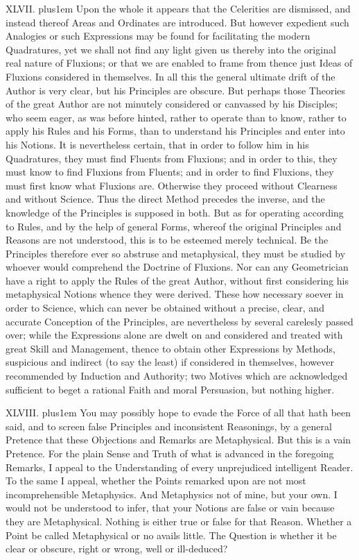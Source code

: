XLVII. \hskip 0pt plus1em
Upon the whole it appears that the Celerities are dismissed, and
instead thereof Areas and Ordinates are introduced.  But however
expedient such Analogies or such Expressions may be found for
facilitating the modern Quadratures, yet we shall not find any
light given us thereby into the original real nature of Fluxions;
or that we are enabled to frame from thence just Ideas of
Fluxions considered in themselves.  In all this the general
ultimate drift of the Author is very clear, but his Principles
are obscure.  But perhaps those Theories of the great Author are
not minutely considered or canvassed by his Disciples; who seem
eager, as was before hinted, rather to operate than to know,
rather to apply his Rules and his Forms, than to understand his
Principles and enter into his Notions.  It is nevertheless
certain, that in order to follow him in his Quadratures, they
must find Fluents from Fluxions; and in order to this, they must
know to find Fluxions from Fluents; and in order to find
Fluxions, they must first know what Fluxions are.  Otherwise they
proceed without Clearness and without Science.  Thus the direct
Method precedes the inverse, and the knowledge of the Principles
is supposed in both.  But as for operating according to Rules,
and by the help of general Forms, whereof the original Principles
and Reasons are not understood, this is to be esteemed merely
technical.  Be the Principles therefore ever so abstruse and
metaphysical, they must be studied by whoever would comprehend
the Doctrine of Fluxions.  Nor can any Geometrician have a right
to apply the Rules of the great Author, without first considering
his metaphysical Notions whence they were derived.  These how
necessary soever in order to Science, which can never be obtained
without a precise, clear, and accurate Conception of the
Principles, are nevertheless by several carelesly passed over;
while the Expressions alone are dwelt on and considered and
treated with great Skill and Management, thence to obtain other
Expressions by Methods, suspicious and indirect (to say the
least) if considered in themselves, however recommended by
Induction and Authority; two Motives which are acknowledged
sufficient to beget a rational Faith and moral Persuasion, but
nothing higher.

\medbreak

XLVIII. \hskip 0pt plus1em
You may possibly hope to evade the Force of all that hath been
said, and to screen false Principles and inconsistent Reasonings,
by a general Pretence that these Objections and Remarks are
Metaphysical.  But this is a vain Pretence.  For the plain Sense
and Truth of what is advanced in the foregoing Remarks, I appeal
to the Understanding of every unprejudiced intelligent Reader.
To the same I appeal, whether the Points remarked upon are not
most incomprehensible Metaphysics.  And Metaphysics not of mine,
but your own.  I would not be understood to infer, that your
Notions are false or vain because they are Metaphysical.  Nothing
is either true or false for that Reason.  Whether a Point be
called Metaphysical or no avails little.  The Question is whether
it be clear or obscure, right or wrong, well or ill-deduced?

